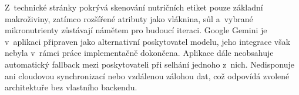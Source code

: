 Z~technické stránky pokrývá skenování nutričních etiket pouze základní makroživiny, zatímco rozšířené atributy jako vláknina, sůl a~vybrané mikronutrienty zůstávají námětem pro budoucí iteraci.
Google Gemini je v~aplikaci připraven jako alternativní poskytovatel modelu, jeho integrace však nebyla v~rámci práce implementačně dokončena.
Aplikace dále neobsahuje automatický fallback mezi poskytovateli při selhání jednoho z~nich.
Nedisponuje ani cloudovou synchronizací nebo vzdálenou zálohou dat, což odpovídá zvolené architektuře bez vlastního backendu.


